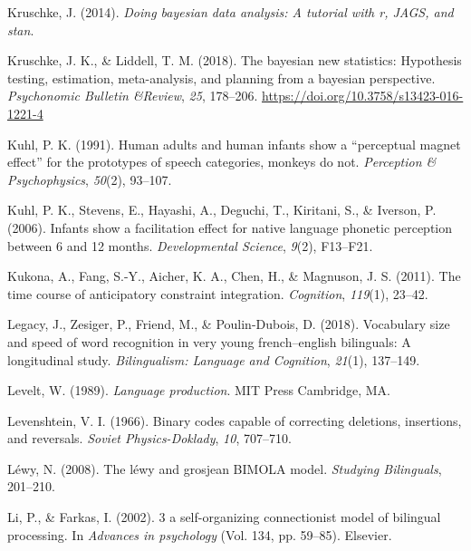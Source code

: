 \documentclass[
  12pt,
  b5paperpaper,
  twoside]{scrreprt}
\newlength{\cslhangindent}
\newlength{\cslentryspacingunit} %
\newenvironment{CSLReferences}[2] %
 {%
  \setlength{\parindent}{0pt}
  \ifodd #1
  \let\oldpar\par
  \def\par{\hangindent=\cslhangindent\oldpar}
  \fi
  \setlength{\parskip}{#2\cslentryspacingunit}
 }%
 {}
\begin{document}
\begin{CSLReferences}{1}{0}
\leavevmode{}%
Kruschke, J. (2014). \emph{Doing bayesian data analysis: A tutorial with
r, JAGS, and stan}.

\leavevmode{}%
Kruschke, J. K., \& Liddell, T. M. (2018). The bayesian new statistics:
Hypothesis testing, estimation, meta-analysis, and planning from a
bayesian perspective. \emph{Psychonomic Bulletin \&Review}, \emph{25},
178--206. \url{https://doi.org/10.3758/s13423-016-1221-4}

\leavevmode{}%
Kuhl, P. K. (1991). Human adults and human infants show a {``perceptual
magnet effect''} for the prototypes of speech categories, monkeys do
not. \emph{Perception \& Psychophysics}, \emph{50}(2), 93--107.

\leavevmode{}%
Kuhl, P. K., Stevens, E., Hayashi, A., Deguchi, T., Kiritani, S., \&
Iverson, P. (2006). Infants show a facilitation effect for native
language phonetic perception between 6 and 12 months.
\emph{Developmental Science}, \emph{9}(2), F13--F21.

\leavevmode{}%
Kukona, A., Fang, S.-Y., Aicher, K. A., Chen, H., \& Magnuson, J. S.
(2011). The time course of anticipatory constraint integration.
\emph{Cognition}, \emph{119}(1), 23--42.

\leavevmode{}%
Legacy, J., Zesiger, P., Friend, M., \& Poulin-Dubois, D. (2018).
Vocabulary size and speed of word recognition in very young
french--english bilinguals: A longitudinal study. \emph{Bilingualism:
Language and Cognition}, \emph{21}(1), 137--149.

\leavevmode{}%
Levelt, W. (1989). \emph{Language production}. MIT Press Cambridge, MA.

\leavevmode{}%
Levenshtein, V. I. (1966). Binary codes capable of correcting deletions,
insertions, and reversals. \emph{Soviet Physics-Doklady}, \emph{10},
707--710.

\leavevmode{}%
Léwy, N. (2008). The l{é}wy and grosjean BIMOLA model. \emph{Studying
Bilinguals}, 201--210.

\leavevmode{}%
Li, P., \& Farkas, I. (2002). 3 a self-organizing connectionist model of
bilingual processing. In \emph{Advances in psychology} (Vol. 134, pp.
59--85). Elsevier.


\end{CSLReferences}
\end{document}
